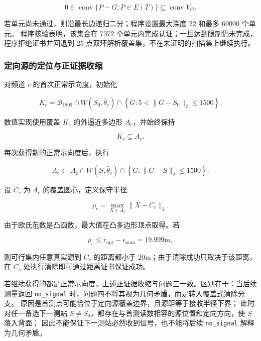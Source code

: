 \begin{equation}
0\in\operatorname{conv}\{P-G:P\in E(T)\}\subseteq\operatorname{conv}V_G.
\label{eq:q4_cell_certificate}
\end{equation}

若单元尚未通过，则沿最长边递归二分；程序设置最大深度 22 和最多 60000 个单元。
程序核验表明，该集合在 7372 个单元内完成认证；一旦达到限制仍未完成，程序拒绝证书并回退到 25 点双环解析覆盖集，不在未证明的扫描集上继续执行。

\subsubsection{定向源的定位与正证据收缩}

对频道 $c$ 的首次正常示向度，初始化

\begin{equation}
K_c=
\mathcal B_{1800}
\cap
W(S_0,\hat\theta_c)
\cap
\left\{
G:
5<\lVert G-S_0\rVert_2\le1500
\right\}.
\label{eq:q4_initial_region}
\end{equation}

数值实现使用覆盖 $K_c$ 的外逼近多边形 $A_c$，并始终保持

\begin{equation}
K_c\subseteq A_c.
\label{eq:q4_outer_contain}
\end{equation}

每次获得新的正常示向度后，执行

\begin{equation}
A_c\leftarrow
A_c\cap W(S,\hat\theta_c)\cap
\left\{
G:
\lVert G-S\rVert_2\le1500
\right\}.
\label{eq:q4_region_update}
\end{equation}

设 $C_c$ 为 $A_c$ 的覆盖圆心，定义保守半径

\begin{equation}
\rho_c=\max_{X\in A_c}\lVert X-C_c\rVert_2.
\label{eq:q4_outer_radius}
\end{equation}

由于欧氏范数是凸函数，最大值在凸多边形顶点取得。若

\begin{equation}
\rho_c\le r_{\mathrm{opt}}-\epsilon_{\mathrm{num}}
=19.999\mathrm{m},
\label{eq:q4_clear_certificate}
\end{equation}

则可行集内任意真实源到 $C_c$ 的距离都小于 $20\mathrm{m}$；由于清除成功只取决于该距离，在 $C_c$ 处执行清除即可通过距离证书保证成功。

若继续获得的都是正常示向度，上述正证据收缩与问题三一致。区别在于：当后续测量返回 \texttt{no\_signal} 时，问题四不将其视为几何矛盾，而是转入覆盖式清除分支。
原因是首测点可能恰位于定向源覆盖边界，且源距等于接收半径下界；
此时对任一备选下一测站 $S\ne S_0$，都存在与首测读数相容的源位置和定向方向，使 $S$ 落入背面；
因此不能保证下一测站必然收到信号，也不能将后续 \texttt{no\_signal} 解释为几何矛盾。

